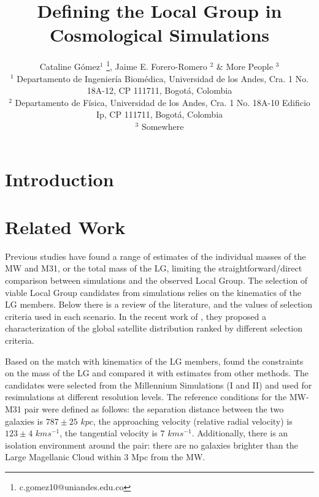 \documentclass[fleqn,usenatbib]{mnras}
\begin{document}
\title[The Local Group in Simulations]{Defining the Local Group in
  Cosmological Simulations}  

\author[Catalina G\'omez et al.]{
  Cataline G\'omez$^{1}$
  \thanks{c.gomez10@uniandes.edu.co},
  Jaime E. Forero-Romero $^{2}$
  \&
  More People $^{3}$
  \\
  $^{1}$ Departamento de Ingenier\'ia Biom\'edica, Universidad de los
  Andes, Cra. 1 No. 18A-12, CP 111711, Bogot\'a, Colombia \\
  $^{2}$ Departamento de F\'isica, Universidad de los Andes, Cra. 1
  No. 18A-10 Edificio Ip, CP 111711, Bogot\'a, Colombia \\
  $^{3}$ Somewhere\\
}

\maketitle

\begin{abstract}

 \end{abstract}


\section{Introduction}
 
\section{Related Work}
Previous studies have found a range of estimates of the individual masses of the MW and M31, or the total mass of the LG\cite{fattahi2016apostle}, limiting the straightforward/direct comparison between simulations and the observed Local Group. The selection of viable Local Group candidates from simulations relies on the kinematics of the LG members. Below there is a review of the literature, and the values of selection criteria used in each scenario. 
In the recent work of \cite{forero2018we}, they proposed a characterization of the global satellite distribution ranked by different selection criteria.

Based on the match with kinematics of the LG members, \cite{fattahi2016apostle} found the constraints on the mass of the LG and compared it with estimates from other methods. The candidates were selected from the Millennium Simulations (I and II) and used for resimulations at different resolution levels. The reference conditions for the MW-M31 pair were defined as follows: the separation distance between the two galaxies is $787 \pm 25$ $kpc$, the approaching velocity (relative radial velocity) is $123 \pm 4$ $kms^{-1}$, the tangential velocity is $7$ $kms^{-1}$. Additionally, there is an isolation environment around \cite{forero2018we}
the pair: there are no galaxies brighter than the Large Magellanic Cloud within 3 Mpc from the MW. 
\end{document}
